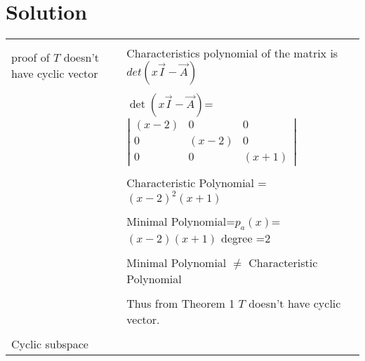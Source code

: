 \documentclass[journal,12pt]{IEEEtran}
\begin{document}
\section{\textbf{Solution}}
\renewcommand{\thetable}{2}
\begin{longtable}{|l|l|}
\hline

\multirow{3}{*}{proof of $T$ doesn't have cyclic vector } & \\
&
Characteristics polynomial of the matrix  is $det(x\vec{I}-\vec{A})$\\ 
&\\
& $\det(x\vec{I}-\vec{A})$= $\left|
                \begin{array}{ccc}
                (x-2) & 0 & 0\\
                0 & (x-2) & 0\\
                0 & 0 & (x+1)
                \end{array} \right|$  \\
&\\
& Characteristic Polynomial = $(x-2)^2(x+1)$\\
&\\
& Minimal Polynomial=$p_a(x)$=$(x-2)(x+1)$  degree =2   \\
&\\
&Minimal Polynomial $\neq$ Characteristic Polynomial \\
&\\
&Thus from Theorem 1 $T$ doesn't have cyclic vector.\\  
&\\
\hline
\multirow{3}{*}{Cyclic subspace} & \\


\end{longtable}
\end{document}
